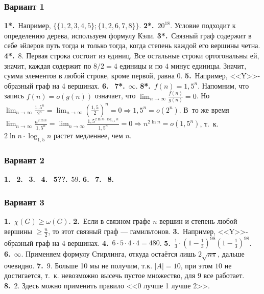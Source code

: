 \documentclass[oneside]{book}
\begin{document}
\subsubsection{Вариант 1}

\textbf{1*.}~Например, $\{\{1,2,3,4,5\}; \{1,2,6,7,8\}\}$.
\textbf{2*.}~$20^{18}$. Условие подходит к определению дерева, используем формулу Кэли.
\textbf{3*.}~Связный граф содержит в себе эйлеров путь тогда и только тогда, когда степень каждой его вершины четна.
\textbf{4*.}~$8$. Первая строка состоит из единиц. Все остальные строки ортогональны ей, значит, каждая содержит по $8/2 = 4$ единицы и по $4$ минус единицы. Значит, сумма элементов в любой строке, кроме первой, равна $0$.
\textbf{5.}~Например, <<Y>>-образный граф на 4 вершинах.
\textbf{6.}~
\textbf{7*.}~$\infty$.
\textbf{8*.}~$f(n) = 1{,}5^n$. Напомним, что запись $f(n) = o(g(n))$ означает, что $\displaystyle \lim_{n \to \infty}\frac{f(n)}{g(n)} = 0$. Но $\displaystyle \lim_{n \to \infty}\frac{1{,}5^n}{{2}^{n}} = \lim_{n \to \infty}\left(\frac{1{,}5}{2}\right)^n = 0 \Rightarrow 1{,}5^n = o(2^n)$. В~то же время $\displaystyle \lim_{n \to \infty}\frac{n^{2 \ln n}}{1{,}5^n} = \lim_{n \to \infty}\frac{1{,}5^{2 \ln n \cdot \log_{1{,}5} n}}{1{,}5^n} = 0 \Rightarrow n^{2 \ln n} = o(1{,}5^n)$, т.~к. $2 \ln n \cdot \log_{1{,}5} n$ растет медленнее, чем $n$.

\subsubsection{Вариант 2}

\textbf{1.}~
\textbf{2.}~
\textbf{3.}~
\textbf{4.}~
\textbf{5??.}~$59$.
\textbf{6.}~
\textbf{7.}~
\textbf{8.}~

\subsubsection{Вариант 3}

\textbf{1.}~$\chi(G) \geqslant \omega(G)$.
\textbf{2.}~Если в связном графе $n$ вершин и  степень любой вершины $\geqslant \frac{n}{2}$, то этот связный граф --- гамильтонов.
\textbf{3.}~Например, <<Y>>-образный граф на 4 вершинах.
\textbf{4.}~$6 \cdot 5 \cdot 4 \cdot 4 = 480$.
\textbf{5.}~$\displaystyle \frac{1}{3} \cdot \left(1-\frac{1}{3}\right)^{98} \left(1-\frac{1}{3}\right)^{98}$.
\textbf{6.}~$\infty$. Применяем формулу Стирлинга, откуда остаётся лишь $2\sqrt{n\pi}$, дальше очевидно.
\textbf{7.}~$9$. Больше 10 мы не получим, т.к. $|A| = 10$, при этом $10$ не достигается, т.~к. невозможно высечь пустое множество, для 9 все работает.
\textbf{8.}~2. Здесь можно применить правило <<0 лучше 1 лучше 2>>.
\end{document}
